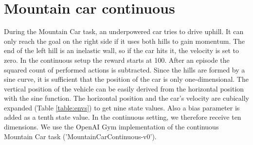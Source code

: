 \section{Mountain car continuous}


During the Mountain Car task, an underpowered car tries to drive uphill. It can only reach the goal on the right side if it uses both hills to gain momentum. The end of the left hill is an inelastic wall, so if the car hits it, the velocity is set to zero. In the continuous setup the reward starts at 100. After an episode the squared count of performed actions is subtracted. Since the hills are formed by a sine curve, it is sufficient that the position of the car is only one-dimensional. The vertical position of the vehicle can be easily derived from the horizontal position with the sine function. The horizontal position and the car's velocity are cubically expanded (Table \ref{table:envs}) to get nine state values. Also a bias parameter is added as a tenth state value. In the continuous setting, we therefore receive ten dimensions. We use the OpenAI Gym implementation of the continuous Mountain Car task ('MountainCarContinuous-v0').




%
%

